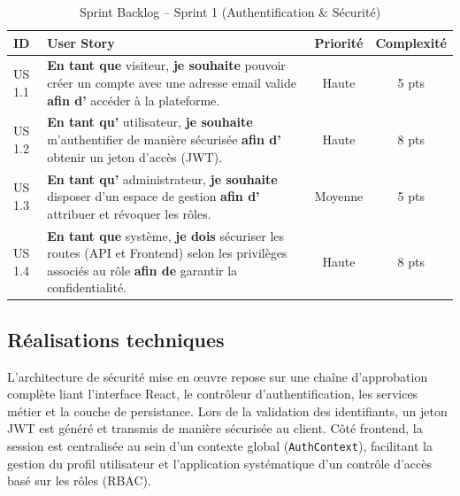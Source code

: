 \documentclass[12pt,a4paper]{report}
\begin{document}
\vspace{0.5cm}
\begin{table}[H]
\centering
\renewcommand{\arraystretch}{1.4}
\caption{Sprint Backlog -- Sprint 1 (Authentification \& Sécurité)}
\vspace{0.2cm}
\begin{tabularx}{\textwidth}{l X c c}
\toprule
\textbf{ID} & \textbf{User Story} & \textbf{Priorité} & \textbf{Complexité} \\
\midrule
US 1.1 & \textbf{En tant que} visiteur, \textbf{je souhaite} pouvoir créer un compte avec une adresse email valide \textbf{afin d'} accéder à la plateforme. & Haute & 5 pts \\
US 1.2 & \textbf{En tant qu'} utilisateur, \textbf{je souhaite} m'authentifier de manière sécurisée \textbf{afin d'} obtenir un jeton d'accès (JWT). & Haute & 8 pts \\
US 1.3 & \textbf{En tant qu'} administrateur, \textbf{je souhaite} disposer d'un espace de gestion \textbf{afin d'} attribuer et révoquer les rôles. & Moyenne & 5 pts \\
US 1.4 & \textbf{En tant que} système, \textbf{je dois} sécuriser les routes (API et Frontend) selon les privilèges associés au rôle \textbf{afin de} garantir la confidentialité. & Haute & 8 pts \\
\bottomrule
\end{tabularx}
\end{table}

\subsection{Réalisations techniques}

L’architecture de sécurité mise en œuvre repose sur une chaîne d'approbation complète liant l’interface React, le contrôleur d’authentification, les services métier et la couche de persistance. Lors de la validation des identifiants, un jeton JWT est généré et transmis de manière sécurisée au client. Côté frontend, la session est centralisée au sein d'un contexte global (\texttt{AuthContext}), facilitant la gestion du profil utilisateur et l’application systématique d'un contrôle d’accès basé sur les rôles (RBAC).
\end{document}
